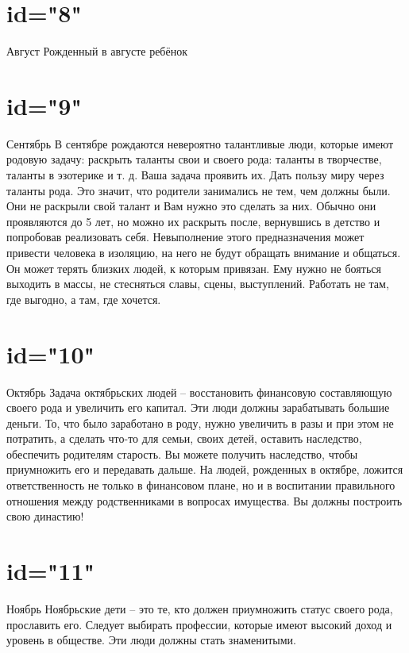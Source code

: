 \section{id="8"}{Август}
Рожденный в августе ребёнок
\endsection

\section{id="9"}{Сентябрь}
В сентябре рождаются невероятно талантливые люди, которые имеют 
родовую задачу: раскрыть таланты свои и своего рода: таланты в 
творчестве, таланты в эзотерике и т. д. 
Ваша задача проявить их. Дать пользу миру через таланты рода. 
Это значит, что родители занимались не тем, чем должны были. 
Они не раскрыли свой талант и Вам нужно это сделать за них.
Обычно они проявляются до 5 лет, но можно их раскрыть после, 
вернувшись в детство и попробовав реализовать себя.
Невыполнение этого предназначения может привести человека в изоляцию, 
на него не будут обращать внимание и общаться. Он может терять близких 
людей, к которым привязан. Ему нужно не бояться выходить в массы, 
не стесняться славы, сцены, выступлений. Работать не там, где выгодно, 
а там, где хочется.
\endsection

\section{id="10"}{Октябрь}
Задача октябрьских людей – восстановить финансовую составляющую 
своего рода и увеличить его капитал. Эти люди должны зарабатывать 
большие деньги.
То, что было заработано в роду, нужно увеличить в разы и при этом 
не потратить, а сделать что-то для семьи, своих детей, оставить 
наследство, обеспечить родителям старость. Вы можете получить 
наследство, чтобы приумножить его и передавать дальше.
На людей, рожденных в октябре, ложится ответственность не только 
в финансовом плане, но и в воспитании правильного отношения между 
родственниками в вопросах имущества.
Вы должны построить свою династию!
\endsection

\section{id="11"}{Ноябрь}
Ноябрьские дети – это те, кто должен приумножить статус своего рода, 
прославить его.
Следует выбирать профессии, которые имеют высокий доход и уровень 
в обществе. Эти люди должны стать знаменитыми.
\endsection


